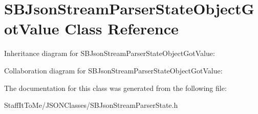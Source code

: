 \hypertarget{interface_s_b_json_stream_parser_state_object_got_value}{
\section{\-S\-B\-Json\-Stream\-Parser\-State\-Object\-Got\-Value \-Class \-Reference}
\label{interface_s_b_json_stream_parser_state_object_got_value}
}


\-Inheritance diagram for \-S\-B\-Json\-Stream\-Parser\-State\-Object\-Got\-Value\-:


\-Collaboration diagram for \-S\-B\-Json\-Stream\-Parser\-State\-Object\-Got\-Value\-:


\-The documentation for this class was generated from the following file\-:\begin{DoxyCompactItemize}
\item 
\-Staff\-It\-To\-Me/\-J\-S\-O\-N\-Classes/\-S\-B\-Json\-Stream\-Parser\-State.\-h\end{DoxyCompactItemize}
